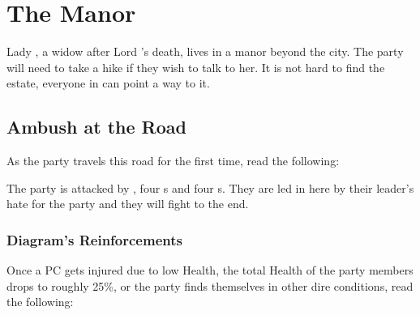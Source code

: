 \section{The Manor}
\label{sec:theManor}

Lady \npcKharbranthNoble{}, a widow after Lord \npcKharbranthNoble{}'s death, lives in a manor beyond the city. The party will need to take a hike if they wish to talk to her. It is not hard to find the estate, everyone in \locationKharbranth{} can point a way to it.




\subsection{Ambush at the Road}

As the party travels this road for the first time, read the following:


The party is attacked by \enemySingerHaevenlyOne{}, four \enemySingerDireform{}s and four \enemySingerStormform{}s. They are led in here by their leader's hate for the party and they will fight to the end.


\subsubsection{Diagram's Reinforcements}

Once a PC gets injured due to low Health, the total Health of the party members drops to roughly 25\%, or the party finds themselves in other dire conditions, read the following:


